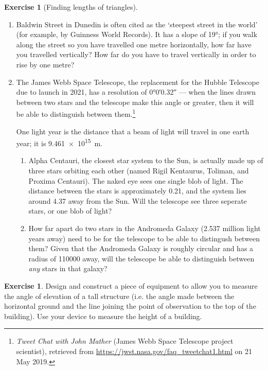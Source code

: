 \documentclass[a4paper]{report}
\theoremstyle{definition}
\newtheorem{exercise}[thm]{Exercise}
\begin{document}
\begin{exercise}[Finding lengths of triangles]
\begin{enumerate}
      \item Baldwin Street in Dunedin is often cited as the `steepest street in the world' (for example, by Guinness World Records).
            It has a slope of \ang{19}; if you walk along the street so you have travelled one metre horizontally, how far have you
            travelled vertically? How far do you have to travel vertically in order to rise by one metre?
      \item The James Webb Space Telescope, the replacement for the Hubble Telescope due to launch in 2021, has a resolution of \ang{0;0;0.32} ---
            when the lines drawn between two stars and the telescope make this angle or greater, then it will be able to distinguish between them.\footnote{\textit{Tweet Chat with John Mather} (James Webb Space Telescope project scientist), retrieved from \url{https://jwst.nasa.gov/faq_tweetchat1.html} on 21 May 2019.}

            One light year is the distance that a beam of light will travel in one earth year; it is \SI{9.461e15}{\metre}.
        \begin{enumerate}
          \item Alpha Centauri, the closest star system to the Sun, is actually made up of three stars orbiting each other (named Rigil Kentaurus,
                Toliman, and Proxima Centauri). The naked eye sees one single blob of light. The distance between the stars is approximately \SI{0.21}{\lightyear},
                and the system lies around \SI{4.37}{\lightyear} away from the Sun. Will the telescope see three seperate stars, or one blob of light?
          \item How far apart do two stars in the Andromeda Galaxy (2.537 million light years away) need to be for the telescope to be able to
                distingush between them? Given that the Andromeda Galaxy is roughly circular and has a radius of \SI{110000}{\lightyear} away,
                will the telescope be able to distinguish between \emph{any} stars in that galaxy?
        \end{enumerate}
    \end{enumerate}
  \end{exercise}

  \begin{exercise}
    Design and construct a piece of equipment to allow you to measure the angle of elevation of a tall structure (i.e. the
    angle made between the horizontal ground and the line joining the point of observation to the top of the building). Use
    your device to measure the height of a building.
  \end{exercise}
\end{document}
